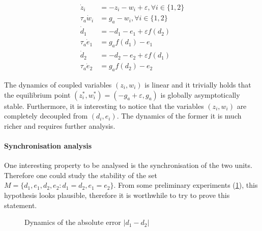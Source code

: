 \begin{equation} 
\begin{aligned}
\dot z_i &= - z_i - w_i + \varepsilon, \forall i \in \{1,2\} \\
\tau_a \dot w_i &= g_a - w_i , \forall i \in \{1,2\} \\
\dot d_{1} &= - d_1 - e_1 + \varepsilon f(d_2) \\
\tau_a \dot{e}_{1} &= g_a f(d_1) - e_{1} \\
\dot d_{2} &= - d_2 - e_2 + \varepsilon f(d_1) \\
\tau_a \dot{e}_{2} &= g_a f(d_2) - e_{2} 
\end{aligned}
\end{equation}

The dynamics of coupled variables $(z_i, w_i)$ is linear and it trivially holds that the equilibrium point $(z_i^*,w_i^*)=(-g_a+\varepsilon, g_a)$ is globally asymptotically stable. Furthermore, it is interesting to notice that the variables  $(z_i, w_i)$ are completely decoupled from $(d_i, e_i)$. The dynamics of the former it is much richer and requires further analysis. 
\paragraph{Synchronisation analysis}
One interesting property to be analysed is the synchronisation of the two units. Therefore one could study the stability of the set $M = \{d_1, e_1, d_2, e_2 : d_1 = d_2, e_1 = e_2 \}$. From some preliminary experiments (\cref{fig:2_2_synch}), this hypothesis looks plausible, therefore it is worthwhile to try to prove this statement.

 \begin{figure}[!h]
        \caption{\label{fig:2_2_synch} Dynamics of the absolute error $|d_1-d_2|$}
\end{figure}


